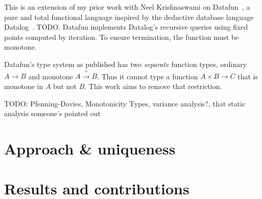 \documentclass[sigplan,screen,dvipsnames]{acmart}
\newcommand\x\times
\newcommand\todo[1]{{\color{Purple}#1}}
\begin{document}
\newcommand\mto{\overset{+}{\to}}

This is an extension of my prior work with Neel Krishnaswami on
Datafun~\citep{datafun}, a pure and total functional language inspired by the
deductive database language Datalog~\citep{datalog}.
%
\todo{TODO. Datafun implements Datalog's recursive queries using fixed points computed by iteration}. To ensure termination, the function must be monotone.

Datafun's type system as published has two \emph{separate} function types,
ordinary $A \to B$ and monotone $A \mto B$. Thus it cannot type a function $A \x
B \to C$ that is monotone in $A$ but not $B$. This work aims to remove that
restriction.


\todo{TODO: Pfenning-Davies, Monotonicity Types, variance analysis?, that static analysis someone's pointed out}



\lipsum[2-4]

\section{Approach \& uniqueness}              %

\lipsum[5]

\section{Results and contributions}

\lipsum[6-8]




\end{document}
